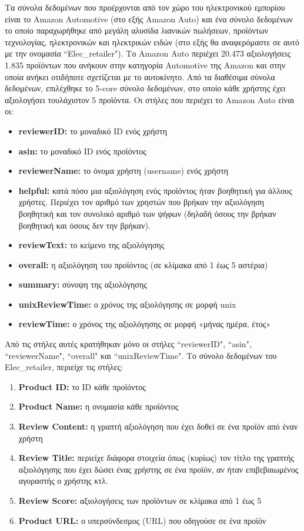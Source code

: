 Τα σύνολα δεδομένων που προέρχονται από τον χώρο του ηλεκτρονικού εμπορίου είναι το Amazon Automotive \cite{mcauleyImagebasedRecommendationsStyles2015} (στο εξής Amazon Auto) και ένα σύνολο δεδομένων το οποίο παραχωρήθηκε από μεγάλη αλυσίδα λιανικών πωλήσεων, προϊόντων τεχνολογίας, ηλεκτρονικών και ηλεκτρικών ειδών (στο εξής θα αναφερόμαστε σε αυτό με την ονομασία ``Elec\_retailer"). Το Amazon Auto περιέχει 20.473 αξιολογήσεις 1.835 προϊόντων που ανήκουν στην κατηγορία Automotive της Amazon και στην οποία ανήκει οτιδήποτε σχετίζεται με το αυτοκίνητο. Από τα διαθέσιμα σύνολα δεδομένων, επιλέχθηκε το 5-core σύνολο δεδομένων, στο οποίο κάθε χρήστης έχει αξιολογήσει τουλάχιστον 5 προϊόντα. Οι στήλες που περιέχει το Amazon Auto είναι οι:\begin{itemize}
	\item \textbf{reviewerID:} το μοναδικό ID ενός χρήστη
	\item \textbf{asin:} το μοναδικό ID ενός προϊόντος
	\item \textbf{reviewerName:} το όνομα χρήστη (username) ενός χρήστη
	\item \textbf{helpful:} κατά πόσο μια αξιολόγηση ενός προϊόντος ήταν βοηθητική για άλλους χρήστες. Περιέχει τον αριθμό των χρηστών που βρήκαν την αξιολόγηση βοηθητική και τον συνολικό αριθμό των ψήφων (δηλαδή όσους την βρήκαν βοηθητική και όσους δεν την βρήκαν).	
	\item \textbf{reviewText:} το κείμενο της αξιολόγησης
	\item \textbf{overall:} η αξιολόγηση του προϊόντος (σε κλίμακα από 1 έως 5 αστέρια)
	\item \textbf{summary:} σύνοψη της αξιολόγησης
	\item \textbf{unixReviewTime:} ο χρόνος της αξιολόγησης σε μορφή unix
	\item \textbf{reviewTime:} ο χρόνος της αξιολόγησης σε μορφή «μήνας ημέρα, έτος»

\end{itemize}
Από τις στήλες αυτές κρατήθηκαν μόνο οι στήλες ``reviewerID", ``asin", ``reviewerName", ``overall" και ``unixReviewTime". 
Το σύνολο δεδομένων του Elec\_retailer, περιείχε τις στήλες:
 \begin{enumerate}
	\item \textbf{Product ID:} το ID κάθε προϊόντος
	\item \textbf{Product Name:} η ονομασία κάθε προϊόντος
	\item \textbf{Review Content:} η γραπτή αξιολόγηση που έχει δοθεί σε ένα προϊόν από έναν χρήστη
	\item \textbf{Review Title:} περιείχε διάφορα στοιχεία όπως (κυρίως) τον τίτλο της γραπτής αξιολόγησης που έχει δώσει ένας χρήστης σε ένα προϊόν, αν ήταν επιβεβαιωμένος αγοραστής ο χρήστης κτλ.
	\item \textbf{Review Score:} αξιολογήσεις των προϊόντων σε κλίμακα από 1 έως 5
	\item \textbf{Product URL:} ο υπερσύνδεσμος (URL) που οδηγούσε σε ένα προϊόν
\end{enumerate} 
